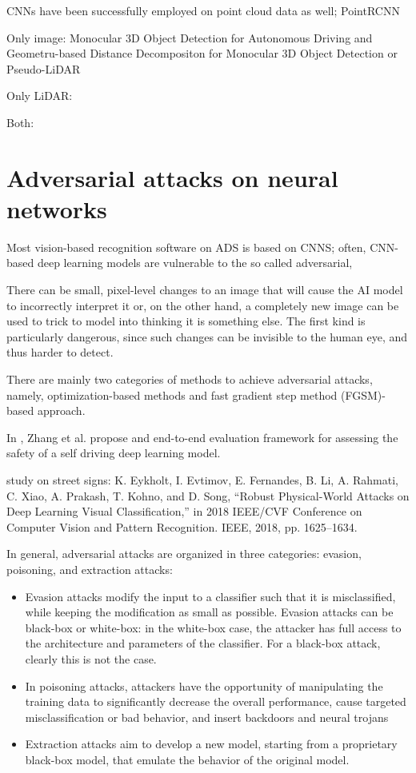CNNs have been successfully employed on point cloud data as well; PointRCNN





Only image: Monocular 3D Object Detection for Autonomous Driving and Geometru-based Distance Decompositon for Monocular 3D Object Detection or Pseudo-LiDAR

Only LiDAR: 

Both:





\newpage
\section{Adversarial attacks on neural networks}
Most vision-based recognition software on ADS is based on CNNS; often, CNN-based deep learning models are vulnerable to the so called adversarial, 

There can be small, pixel-level changes to an image that will cause the AI model to incorrectly interpret it or, on the other hand, a completely new image can be used to trick to model into thinking it is something else. The first kind is particularly dangerous, since such changes can be invisible to the human eye, and thus harder to detect.

There are mainly two categories of methods to achieve adversarial attacks, namely, optimization-based methods and fast gradient step method (FGSM)-based approach.


In \cite{DBLP:journals/iotj/ZhangLWWLJ22}, Zhang et al. propose and end-to-end evaluation framework for assessing the safety of a self driving deep learning model.



study on street signs: K. Eykholt, I. Evtimov, E. Fernandes, B. Li, A. Rahmati, C. Xiao,
A. Prakash, T. Kohno, and D. Song, “Robust Physical-World Attacks on
Deep Learning Visual Classification,” in 2018 IEEE/CVF Conference on
Computer Vision and Pattern Recognition. IEEE, 2018, pp. 1625–1634.


In general, adversarial attacks are organized in three categories: evasion, poisoning, and extraction attacks:
\begin{itemize}
    \item Evasion attacks modify the input to a classifier such that it is misclassified, while keeping the modification as small as possible. Evasion attacks can be black-box or white-box: in the white-box case, the attacker has full access to the architecture and parameters of the classifier. For a black-box attack, clearly this is not the case.
    \item In poisoning attacks, attackers have the opportunity of manipulating the training data to significantly decrease the overall performance, cause targeted misclassification or bad behavior, and insert backdoors and neural trojans
    \item Extraction attacks aim to develop a new model, starting from a proprietary black-box model, that emulate the behavior of the original model.
\end{itemize}
